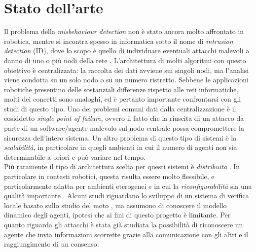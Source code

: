 \documentclass[paper=a4, fontsize=11pt]{scrartcl} %
\numberwithin{equation}{section} %
\numberwithin{table}{section} %
\begin{document}
\section{Stato dell'arte}
Il problema della \textit{misbehaviour detection} non è stato ancora molto affrontato
in robotica, mentre si incontra spesso in informatica sotto il nome di \textit{intrusion detection} (ID), dove lo scopo è quello di individuare eventuali attacchi malevoli 
a danno di uno o più nodi della rete \cite{IDS3}\cite{Pasqualetti_attackdetection}. L'architettura di molti algoritmi con 
questo obiettivo è centralizzata: la raccolta dei dati avviene sui singoli nodi, ma l'analisi viene condotta su un solo nodo o su un numero ristretto. Sebbene le applicazioni robotiche presentino delle sostanziali differenze rispetto alle reti informatiche, molti dei concetti sono analoghi, ed è pertanto importante confrontarsi con gli studi di questo tipo. Uno dei problemi comuni dati dalla centralizzazione è il cosiddetto \textit{single point of failure}, ovvero il
fatto che la riuscita di un attacco da parte di un software/agente malevolo sul nodo centrale possa compromettere la sicurezza dell'intero sistema. 
Un altro problema di questo tipo di sistemi è la \textit{scalabilità}, in particolare in quegli ambienti in cui il numero di 
agenti non sia determinabile a priori e può variare nel tempo. \\

Più raramente il tipo di architettura scelta per questi sistemi è \textit{distribuita} \cite{IDS2}. In particolare in contesti robotici, questa risulta essere molto flessibile, e particolarmente adatta per ambienti eterogenei e in cui la \textit{riconfigurabilità} sia 
una qualità importante \cite{ram10-bfp}. Alcuni studi riguardano 
lo sviluppo di un sistema di verifica locale basato sullo studio del moto \cite{misbehDetection}, ma assumono di conoscere il modello dinamico degli
agenti, ipotesi che ai fini di questo progetto è limitante. Per quanto
riguarda gli attacchi è stata già studiata la possibilità di 
riconoscere un agente che invia informazioni scorrette grazie alla comunicazione con gli altri e il raggiungimento di un consenso\cite{commDetection}. 

\end{document}
